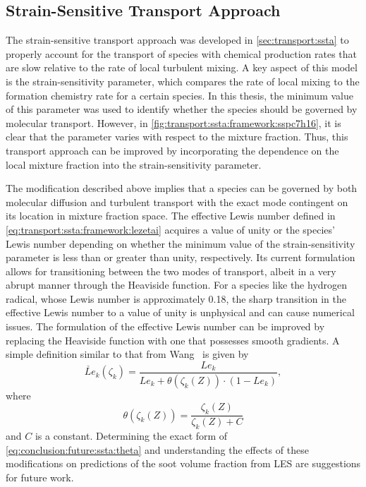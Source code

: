 \subsection{Strain-Sensitive Transport Approach}
\label{sec:conclusion:future:ssta}

The strain-sensitive transport approach was developed in \cref{sec:transport:ssta} to properly account for the transport of species with chemical production rates that are slow relative to the rate of local turbulent mixing. A key aspect of this model is the strain-sensitivity parameter, which compares the rate of local mixing to the formation chemistry rate for a certain species. In this thesis, the minimum value of this parameter was used to identify whether the species should be governed by molecular transport. However, in \cref{fig:transport:ssta:framework:sspc7h16}, it is clear that the parameter varies with respect to the mixture fraction. Thus, this transport approach can be improved by incorporating the dependence on the local mixture fraction into the strain-sensitivity parameter.

The modification described above implies that a species can be governed by both molecular diffusion and turbulent transport with the exact mode contingent on its location in mixture fraction space. The effective Lewis number defined in \cref{eq:transport:ssta:framework:lezetai} acquires a value of unity or the species' Lewis number depending on whether the minimum value of the strain-sensitivity parameter is less than or greater than unity, respectively. Its current formulation allows for transitioning between the two modes of transport, albeit in a very abrupt manner through the Heaviside function. For a species like the hydrogen radical, whose Lewis number is approximately 0.18, the sharp transition in the effective Lewis number to a value of unity is unphysical and can cause numerical issues. The formulation of the effective Lewis number can be improved by replacing the Heaviside function with one that possesses smooth gradients. A simple definition similar to that from Wang~\cite{wang2016} is given by
\begin{equation}\label{eq:conclusion:future:ssta:lezetai}
  \check{Le}_k(\zeta_k) = \frac{Le_k}{Le_k + \theta(\zeta_k(Z)) \cdot (1 - Le_k)},
\end{equation}
where
\begin{equation}\label{eq:conclusion:future:ssta:theta}
  \theta(\zeta_k(Z)) = \frac{\zeta_k(Z)}{\zeta_k(Z) + C}
\end{equation}
and $C$ is a constant. Determining the exact form of \cref{eq:conclusion:future:ssta:theta} and understanding the effects of these modifications on predictions of the soot volume fraction from LES are suggestions for future work.


